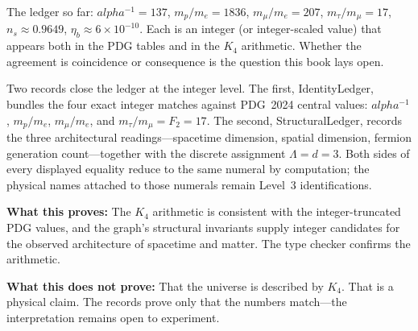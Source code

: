 \documentclass[11pt,a4paper]{book}
\def\alpha{alpha}%
\def\texttt#1{#1}%
\begin{document}
The ledger so far: $\alpha^{-1} = 137$, $m_p/m_e = 1836$, $m_\mu/m_e = 207$, $m_\tau/m_\mu = 17$, $n_s \approx 0.9649$, $\eta_b \approx 6 \times 10^{-10}$. Each is an integer (or integer-scaled value) that appears both in the PDG tables and in the $K_4$ arithmetic. Whether the agreement is coincidence or consequence is the question this book lays open.

Two records close the ledger at the integer level. The first, \texttt{IdentityLedger}, bundles the four exact integer matches against PDG~2024 central values: $\alpha^{-1}$, $m_p/m_e$, $m_\mu/m_e$, and $m_\tau/m_\mu = F_2 = 17$. The second, \texttt{StructuralLedger}, records the three architectural readings---spacetime dimension, spatial dimension, fermion generation count---together with the discrete assignment $\Lambda = d = 3$. Both sides of every displayed equality reduce to the same numeral by computation; the physical names attached to those numerals remain Level~3 identifications.

\textbf{What this proves:} The $K_4$ arithmetic is consistent with the integer-truncated PDG values, and the graph's structural invariants supply integer candidates for the observed architecture of spacetime and matter. The type checker confirms the arithmetic.

\textbf{What this does not prove:} That the universe is described by $K_4$. That is a physical claim. The records prove only that the numbers match---the interpretation remains open to experiment.

\end{document}
